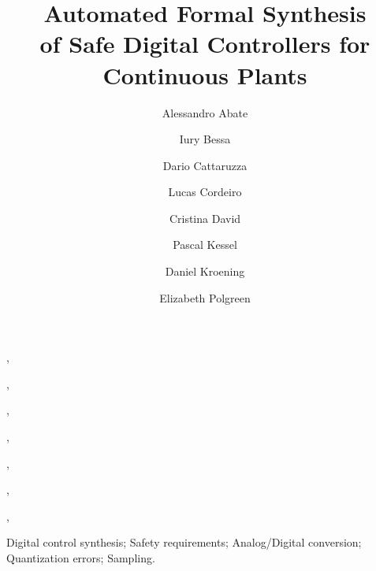\documentclass[twocolumn]{autart}    %
\begin{document}
\newcommand\tool{{\sf DSSynth}}
\begin{frontmatter}



\title{Automated Formal Synthesis\\ 
of Safe Digital Controllers 
for Continuous Plants}


\author[oxford]{Alessandro Abate},
\author[manaus]{Iury Bessa},
\author[oxford]{Dario Cattaruzza},
\author[manchester]{Lucas Cordeiro},
\author[cambridge]{Cristina David},
\author[oxford]{Pascal Kessel},
\author[oxford]{Daniel Kroening},
\author[oxford]{Elizabeth Polgreen}

\address[oxford]{University of Oxford, UK}
\address[cambridge]{University of Cambridge, UK}
\address[manchester]{University of Manchester, UK}
\address[manaus]{Federal University of Amazonas, Brazil} 
          
\begin{keyword}                           %
Digital control synthesis; Safety requirements; Analog/Digital conversion; Quantization errors; Sampling.               %
\end{keyword}                             %




\end{frontmatter}
\end{document}
